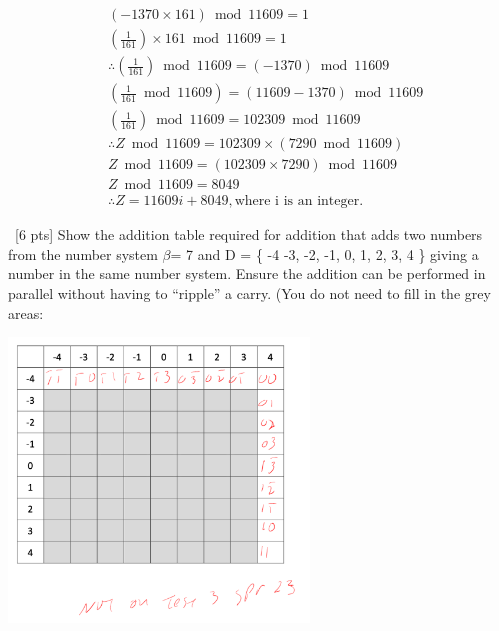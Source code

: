 \documentclass[12pt]{article}
\newenvironment{sol}[1][Solution]{\begin{trivlist}\item[\hskip\labelsep {\bfseries #1:}]}{\end{trivlist}}
\begin{document}
\begin{enumerate}
\begin{sol}
\begin{center}
\begin{align*}
             & (- 1370 \times 161) \bmod 11609 = 1\\
            & (\frac{1}{161}) \times 161 \bmod 11609 = 1 \\ 
            & \therefore (\frac{1}{161})\bmod 11609 = (-1370) \bmod 11609\\
            & (\frac{1}{161} \bmod 11609) = (11609 - 1370) \bmod 11609\\
            & (\frac{1}{161}) \bmod 11609 = 102309 \bmod 11609\\
            & \therefore Z \bmod 11609 = 102309 \times (7290 \bmod 11609) \\
            & Z \bmod 11609 = (102309 \times 7290) \bmod 11609\\
            & Z \bmod 11609 = 8049\\
            & \therefore Z = 11609i + 8049, \text{where i is an integer}.
        \end{align*}
    \end{center}
    \end{sol}

    \item \ [6 pts] Show the addition table required for addition that adds two numbers from the number system $\beta$= 7 and D = \{ -4 -3, -2, -1, 0, 1, 2, 3, 4 \} giving a number in the same number system. Ensure the addition can be performed in parallel without having to “ripple” a carry. (You do not need to fill in the grey areas:
    \begin{sol}
    \hspace*{\fill}
            \begin{center}
    \includegraphics[width=0.6\textwidth]{p2.png}
    \end{center} 
\end{sol}
    

\end{enumerate}
\end{document}
